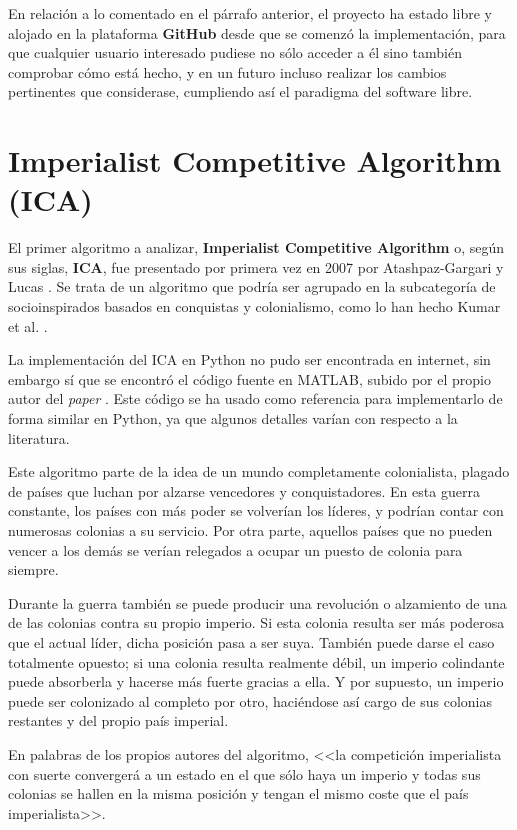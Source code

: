 En relación a lo comentado en el párrafo anterior, el proyecto ha estado libre y alojado en la plataforma \textbf{GitHub} \cite{repositorio-tfg} desde que se comenzó la implementación, para que cualquier usuario interesado pudiese no sólo acceder a él sino también comprobar cómo está hecho, y en un futuro incluso realizar los cambios pertinentes que considerase, cumpliendo así el paradigma del software libre.

\section{Imperialist Competitive Algorithm (ICA)}

El primer algoritmo a analizar, \textbf{Imperialist Competitive Algorithm} o, según sus siglas, \textbf{ICA}, fue presentado por primera vez en 2007 por Atashpaz-Gargari y Lucas \cite{ica-conference}. Se trata de un algoritmo que podría ser agrupado en la subcategoría de socioinspirados basados en conquistas y colonialismo, como lo han hecho Kumar et al. \cite{socio-evolution-algorithm}.

La implementación del ICA en Python no pudo ser encontrada en internet, sin embargo sí que se encontró el código fuente en MATLAB, subido por el propio autor del \textit{paper} \cite{ica-matlab}. Este código se ha usado como referencia para implementarlo de forma similar en Python, ya que algunos detalles varían con respecto a la literatura.

Este algoritmo parte de la idea de un mundo completamente colonialista, plagado de países que luchan por alzarse vencedores y conquistadores. En esta guerra constante, los países con más poder se volverían los líderes, y podrían contar con numerosas colonias a su servicio. Por otra parte, aquellos países que no pueden vencer a los demás se verían relegados a ocupar un puesto de colonia para siempre.

Durante la guerra también se puede producir una revolución o alzamiento de una de las colonias contra su propio imperio. Si esta colonia resulta ser más poderosa que el actual líder, dicha posición pasa a ser suya. También puede darse el caso totalmente opuesto; si una colonia resulta realmente débil, un imperio colindante puede absorberla y hacerse más fuerte gracias a ella. Y por supuesto, un imperio puede ser colonizado al completo por otro, haciéndose así cargo de sus colonias restantes y del propio país imperial.

En palabras de los propios autores del algoritmo, <<la competición imperialista con suerte convergerá a un estado en el que sólo haya un imperio y todas sus colonias se hallen en la misma posición y tengan el mismo coste que el país imperialista>>.

